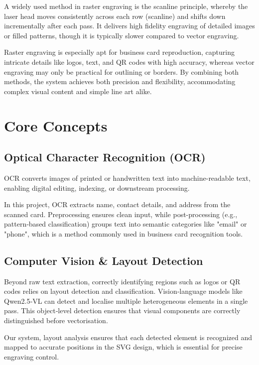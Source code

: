 	A widely used method in raster engraving is the scanline principle, whereby the laser head moves consistently across each row (scanline) and shifts down incrementally after each pass. It delivers high fidelity engraving of detailed images or filled patterns, though it is typically slower compared to vector engraving. \cite{OneLaser:RasterVsVectorEngraving}

	Raster engraving is especially apt for business card reproduction, capturing intricate details like logos, text, and QR codes with high accuracy, whereas vector engraving may only be practical for outlining or borders. By combining both methods, the system achieves both precision and flexibility, accommodating complex visual content and simple line art alike.
	
\section{Core Concepts}

\subsection{Optical Character Recognition (OCR)}
OCR converts images of printed or handwritten text into machine-readable text, enabling digital editing, indexing, or downstream processing.

In this project, OCR extracts name, contact details, and address from the scanned card. Preprocessing ensures clean input, while post-processing (e.g., pattern‑based classification) groups text into semantic categories like "email" or "phone", which is a method commonly used in business card recognition tools. \cite{MadanKumar:BusinessCardOCR2019}

\subsection{Computer Vision \& Layout Detection}
Beyond raw text extraction, correctly identifying regions such as logos or QR codes relies on layout detection and classification. Vision‑language models like Qwen2.5‑VL can detect and localise multiple heterogeneous elements in a single pass. This object‑level detection ensures that visual components are correctly distinguished before vectorisation. \cite{Wikipedia:DocumentLayoutAnalysis}

Our system, layout analysis ensures that each detected element is recognized and mapped to accurate positions in the SVG design, which is essential for precise engraving control. 

